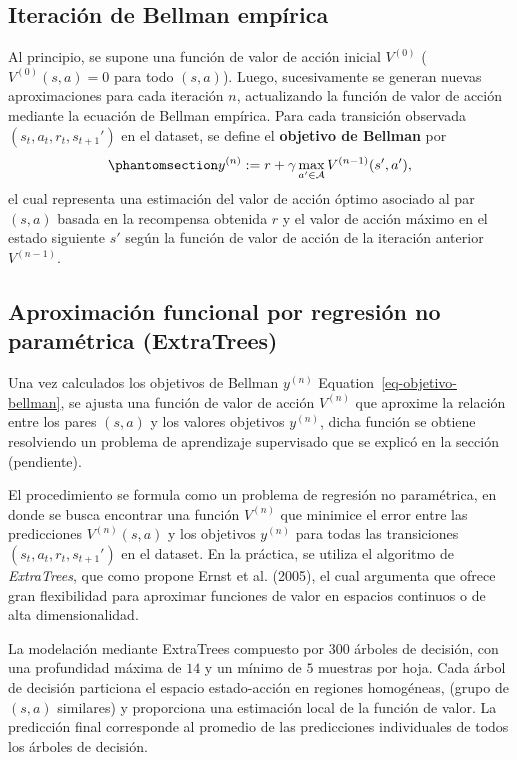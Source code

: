 \documentclass[
  letterpaper,
  DIV=11,
  numbers=noendperiod]{scrreprt}
\theoremstyle{definition}
\theoremstyle{remark}
\begin{document}
\subsection{Iteración de Bellman
empírica}\label{iteraciuxf3n-de-bellman-empuxedrica}

Al principio, se supone una función de valor de acción inicial
\(V^{(0)}\) (\(V^{(0)}(s,a) = 0\) para todo \((s,a)\)). Luego,
sucesivamente se generan nuevas aproximaciones para cada iteración
\(n\), actualizando la función de valor de acción mediante la ecuación
de Bellman empírica. Para cada transición observada
\((s_t, a_t, r_t, s_{t+1}')\) en el dataset, se define el
\textbf{objetivo de Bellman} por
\begin{equation}\protect\phantomsection\label{eq-objetivo-bellman}{y^{(n)} := r + \gamma \max_{a' \in \mathcal{A}} V^{(n-1)}(s',a'),}\end{equation}
el cual representa una estimación del valor de acción óptimo asociado al
par \((s,a)\) basada en la recompensa obtenida \(r\) y el valor de
acción máximo en el estado siguiente \(s'\) según la función de valor de
acción de la iteración anterior \(V^{(n-1)}\).

\subsection{Aproximación funcional por regresión no paramétrica
(ExtraTrees)}\label{aproximaciuxf3n-funcional-por-regresiuxf3n-no-paramuxe9trica-extratrees}

Una vez calculados los objetivos de Bellman \(y^{(n)}\)
Equation~\ref{eq-objetivo-bellman}, se ajusta una función de valor de
acción \(V^{(n)}\) que aproxime la relación entre los pares \((s,a)\) y
los valores objetivos \(y^{(n)}\), dicha función se obtiene resolviendo
un problema de aprendizaje supervisado que se explicó en la sección
(pendiente).

El procedimiento se formula como un problema de regresión no
paramétrica, en donde se busca encontrar una función \(V^{(n)}\) que
minimice el error entre las predicciones \(V^{(n)}(s,a)\) y los
objetivos \(y^{(n)}\) para todas las transiciones
\((s_t, a_t, r_t, s_{t+1}')\) en el dataset. En la práctica, se utiliza
el algoritmo de \emph{ExtraTrees}, que como propone Ernst et al. (2005),
el cual argumenta que ofrece gran flexibilidad para aproximar funciones
de valor en espacios continuos o de alta dimensionalidad.

La modelación mediante ExtraTrees compuesto por \(300\) árboles de
decisión, con una profundidad máxima de \(14\) y un mínimo de \(5\)
muestras por hoja. Cada árbol de decisión particiona el espacio
estado-acción en regiones homogéneas, (grupo de \((s,a)\) similares) y
proporciona una estimación local de la función de valor. La predicción
final corresponde al promedio de las predicciones individuales de todos
los árboles de decisión.
\end{document}
